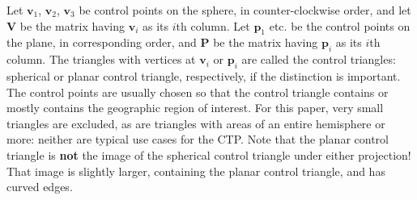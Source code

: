 \documentclass[]{interact}
\begin{document}
Let $\mathbf v_1$, $\mathbf v_2$, $\mathbf v_3$ be control points on the
sphere, in counter-clockwise order, and let $\mathbf V$ be the matrix having
$\mathbf v_i$ as its $i$th column. Let $\mathbf p_1$ etc. be the control points
on the plane, in corresponding order, and $\mathbf P$ be the matrix having
$\mathbf p_i$ as its $i$th column. The triangles with vertices at $\mathbf v_i$
or $\mathbf p_i$ are called the control triangles: spherical or planar control
triangle, respectively, if the distinction is important. The control points
are usually chosen so that the control triangle contains or mostly contains
the geographic region of interest. For this paper,
very small triangles are excluded, as are triangles with areas of an entire
hemisphere or more: neither are typical use cases for the CTP.
Note that the planar control triangle is \textbf{not} the image of the
spherical control triangle under either projection! That image is
slightly larger, containing the planar control triangle, and has curved edges.
\end{document}
